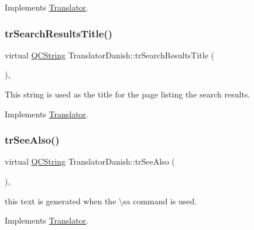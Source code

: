 Implements \mbox{\hyperlink{class_translator}{Translator}}.

\mbox{\label{class_translator_danish_a96dcc5dd9e7b1ee7bdcf140b78eee43d}} 
\subsubsection{\texorpdfstring{trSearchResultsTitle()}{trSearchResultsTitle()}}
{\footnotesize\ttfamily virtual \mbox{\hyperlink{class_q_c_string}{Q\+C\+String}} Translator\+Danish\+::tr\+Search\+Results\+Title (\begin{DoxyParamCaption}{ }\end{DoxyParamCaption})\hspace{0.3cm}{\ttfamily [inline]}, {\ttfamily [virtual]}}

This string is used as the title for the page listing the search results. 

Implements \mbox{\hyperlink{class_translator}{Translator}}.

\mbox{\label{class_translator_danish_a274c72f881b3a6ca1071ece70a4fd608}} 
\subsubsection{\texorpdfstring{trSeeAlso()}{trSeeAlso()}}
{\footnotesize\ttfamily virtual \mbox{\hyperlink{class_q_c_string}{Q\+C\+String}} Translator\+Danish\+::tr\+See\+Also (\begin{DoxyParamCaption}{ }\end{DoxyParamCaption})\hspace{0.3cm}{\ttfamily [inline]}, {\ttfamily [virtual]}}

this text is generated when the \textbackslash{}sa command is used. 

Implements \mbox{\hyperlink{class_translator}{Translator}}.

\mbox{\label{class_translator_danish_ac468aa253ba333d750aef289ab0a58e8}} 
